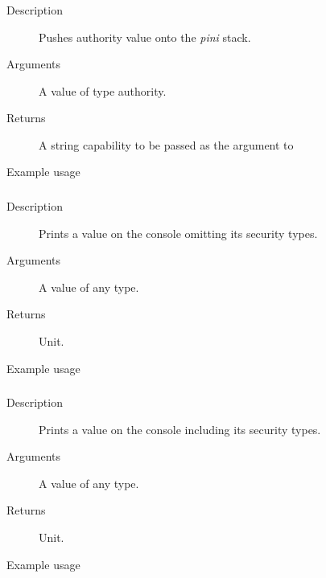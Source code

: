 \subsubsection{}
\begin{description}
    \item [Description] Pushes authority value onto the \emph{pini} stack.
    \item [Arguments] A value of type authority.
    \item [Returns] A string capability to be passed as the argument to 
    \item [Example usage] 
\end{description}

\subsubsection{}
\begin{description}
    \item [Description] Prints a value on the console omitting its security types.
    \item [Arguments] A value of any type.
    \item [Returns] Unit.
    \item [Example usage] 
\end{description}


\subsubsection{}
\begin{description}
    \item [Description] Prints a value on the console including its security types.
    \item [Arguments] A value of any type.
    \item [Returns] Unit.
    \item [Example usage] 
\end{description}

